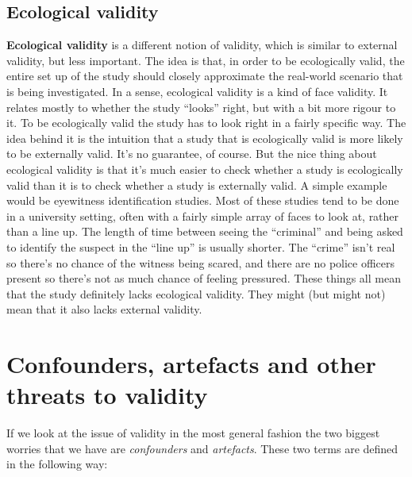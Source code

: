 \documentclass[
  a4paper,
]{book}
\begin{document}
\hypertarget{ecological-validity}{%
\subsection{Ecological validity}\label{ecological-validity}}

\textbf{Ecological validity} is a different notion of validity, which is
similar to external validity, but less important. The idea is that, in
order to be ecologically valid, the entire set up of the study should
closely approximate the real-world scenario that is being investigated.
In a sense, ecological validity is a kind of face validity. It relates
mostly to whether the study ``looks'' right, but with a bit more rigour
to it. To be ecologically valid the study has to look right in a fairly
specific way. The idea behind it is the intuition that a study that is
ecologically valid is more likely to be externally valid. It's no
guarantee, of course. But the nice thing about ecological validity is
that it's much easier to check whether a study is ecologically valid
than it is to check whether a study is externally valid. A simple
example would be eyewitness identification studies. Most of these
studies tend to be done in a university setting, often with a fairly
simple array of faces to look at, rather than a line up. The length of
time between seeing the ``criminal'' and being asked to identify the
suspect in the ``line up'' is usually shorter. The ``crime'' isn't real
so there's no chance of the witness being scared, and there are no
police officers present so there's not as much chance of feeling
pressured. These things all mean that the study definitely lacks
ecological validity. They might (but might not) mean that it also lacks
external validity.

\hypertarget{confounders-artefacts-and-other-threats-to-validity}{%
\section{Confounders, artefacts and other threats to
validity}\label{confounders-artefacts-and-other-threats-to-validity}}

If we look at the issue of validity in the most general fashion the two
biggest worries that we have are \emph{confounders} and
\emph{artefacts}. These two terms are defined in the following way:
\end{document}
